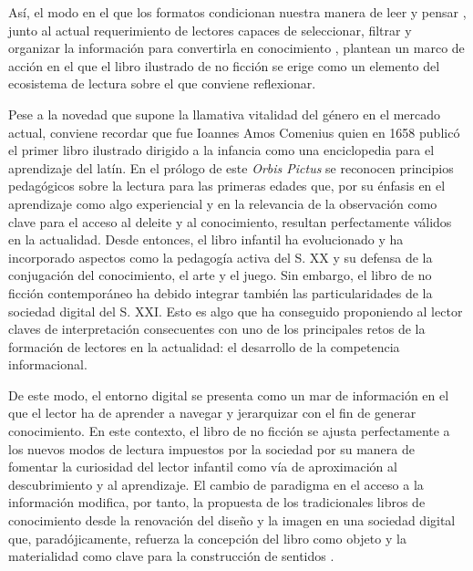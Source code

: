 \documentclass[spanish]{textolivre}
\begin{document}
Así, el modo en el que los formatos condicionan nuestra manera de leer y pensar \cite{littau_teorias_2008}, junto al actual requerimiento de lectores capaces de seleccionar, filtrar y organizar la información para convertirla en conocimiento \cite{european_commission__2018,millan_lectura_2017}, plantean un marco de acción en el que el libro ilustrado de no ficción se erige como un elemento del ecosistema de lectura sobre el que conviene reflexionar.

Pese a la novedad que supone la llamativa vitalidad del género en el mercado actual, conviene recordar que fue Ioannes Amos Comenius quien en 1658 publicó el primer libro ilustrado dirigido a la infancia como una enciclopedia para el aprendizaje del latín. En el prólogo de este \textit{Orbis Pictus} se reconocen principios pedagógicos sobre la lectura para las primeras edades que, por su énfasis en el aprendizaje como algo experiencial y en la relevancia de la observación como clave para el acceso al deleite y al conocimiento, resultan perfectamente válidos en la actualidad. Desde entonces, el libro infantil ha evolucionado y ha incorporado aspectos como la pedagogía activa del S. XX y su defensa de la conjugación del conocimiento, el arte y el juego. Sin embargo, el libro de no ficción contemporáneo ha debido integrar también las particularidades de la sociedad digital del S. XXI. Esto es algo que ha conseguido proponiendo al lector claves de interpretación consecuentes con uno de los principales retos de la formación de lectores en la actualidad: el desarrollo de la competencia informacional.

De este modo, el entorno digital se presenta como un mar de información en el que el lector ha de aprender a navegar y jerarquizar con el fin de generar conocimiento. En este contexto, el libro de no ficción se ajusta perfectamente a los nuevos modos de lectura impuestos por la sociedad por su manera de fomentar la curiosidad del lector infantil \cite{patte_jenlos_2008} como vía de aproximación al descubrimiento y al aprendizaje. El cambio de paradigma en el acceso a la información modifica, por tanto, la propuesta de los tradicionales libros de conocimiento desde la renovación del diseño y la imagen \cite{baro-llambias_libros_1996,baro-llambias_libros_2022,garralon_leer_2013} en una sociedad digital que, paradójicamente, refuerza la concepción del libro como objeto y la materialidad como clave para la construcción de sentidos \cite{cordon-garcia_combates_2018}.
\end{document}
